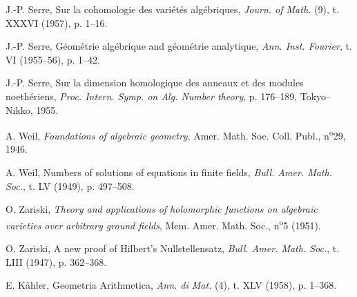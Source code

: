 \begin{thebibliography}{22}
J.-P. Serre,
Sur la cohomologie des vari\'et\'es alg\'ebriques,
\emph{Journ. of Math.} (9),
t. XXXVI (1957),
p. 1--16.

J.-P. Serre,
G\'eom\'etrie alg\'ebrique and g\'eom\'etrie analytique,
\emph{Ann. Inst. Fourier},
t. VI (1955--56),
p. 1--42.

J.-P. Serre,
Sur la dimension homologique des anneaux et des modules noeth\'eriens,
\emph{Proc. Intern. Symp. on Alg. Number theory},
p. 176--189,
Tokyo--Nikko,
1955.

A. Weil,
\emph{Foundations of algebraic geometry},
Amer. Math. Soc. Coll. Publ.,
n\textsuperscript{o}29,
1946.

A. Weil,
Numbers of solutions of equations in finite fields,
\emph{Bull. Amer. Math. Soc.},
t. LV (1949),
p. 497--508.

O. Zariski,
\emph{Theory and applications of holomorphic functions on algebraic varieties over arbitrary ground fields},
Mem. Amer. Math. Soc.,
n\textsuperscript{o}5 (1951).

O. Zariski,
A new proof of Hilbert's Nullstellensatz,
\emph{Bull. Amer. Math. Soc.},
t. LIII (1947),
p. 362--368.

E. K\"ahler,
Geometria Arithmetica,
\emph{Ann. di Mat.} (4),
t. XLV (1958),
p. 1--368.

\end{thebibliography}
